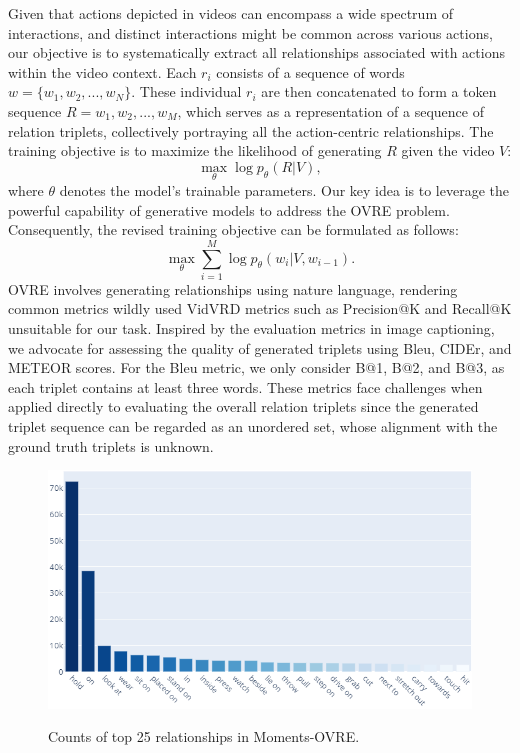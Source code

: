 \documentclass[letterpaper]{article}
\begin{document}
Given that actions depicted in videos can encompass a wide spectrum of interactions, and distinct interactions might be common across various actions, our objective is to systematically extract all relationships associated with actions within the video context.
Each $r_{i}$ consists of a sequence of words $w=\{w_{1},w_{2},...,w_{N}\}$. These individual $r_{i}$ are then concatenated to form a token sequence $R=w_{1},w_{2},...,w_{M}$, which serves as a representation of a sequence of relation triplets, collectively portraying all the action-centric relationships.
The training objective is to maximize the likelihood of generating $R$ given the video $V$:
$$
\underset{\theta}{\max} \log p_{\theta}(R|V),
$$
where $\theta$ denotes the model's trainable parameters.
Our key idea is to leverage the powerful capability of generative models to address the OVRE problem.
Consequently, the revised training objective can be formulated as follows:
$$
\underset{\theta}{\max}\sum_{i=1}^{M}\log p_{\theta}(w_{i}|V,w_{i-1}).
$$
OVRE involves generating relationships using nature language, rendering common metrics wildly used VidVRD metrics such as Precision@K and Recall@K unsuitable for our task.
Inspired by the evaluation metrics in image captioning, we advocate for assessing the quality of generated triplets using Bleu, CIDEr, and METEOR scores.
For the Bleu metric, we only consider B@1, B@2, and B@3, as each triplet contains at least three words.
These metrics face challenges when applied directly to evaluating the overall relation triplets since the generated triplet sequence can be regarded as an unordered set, whose alignment with the ground truth triplets is unknown.

\begin{figure}[t]
  \centering
  \resizebox{1.0\linewidth}{4cm}
  {\includegraphics{fig/rel.png}}
  \caption{Counts of top 25 relationships in Moments-OVRE.}
  \label{fig:freq}
\end{figure}
\end{document}

